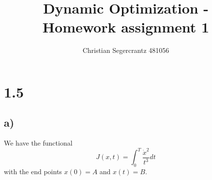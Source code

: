 \documentclass{article}
\title{Dynamic Optimization - Homework assignment 1}
\author{Christian Segercrantz 481056}
\begin{document}
	\maketitle
	\pagebreak

\section*{1.5}
\subsection*{a)}

We have the functional
\begin{equation}
	J(x,t) = \int_{0}^{T} \frac{\dot{x}^2}{t^3}dt
\end{equation}
with the end points $x(0) = A$ and $x(t) = B$.
\end{document}
